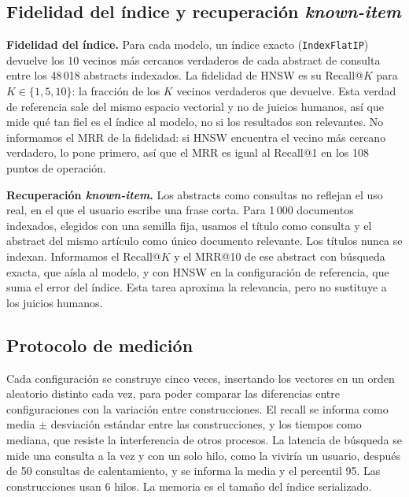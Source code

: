 \documentclass[runningheads]{llncs}
\begin{document}
\subsection{Fidelidad del índice y recuperación \textit{known-item}}

\textbf{Fidelidad del índice.} Para cada modelo, un índice exacto (\texttt{IndexFlatIP})
devuelve los 10 vecinos más cercanos verdaderos de cada abstract de consulta entre los 48\,018
abstracts indexados. La fidelidad de HNSW es su Recall@$K$ para $K \in \{1,5,10\}$: la
fracción de los $K$ vecinos verdaderos que devuelve. Esta verdad de referencia sale del mismo
espacio vectorial y no de juicios humanos, así que mide qué tan fiel es el índice al modelo,
no si los resultados son relevantes. No informamos el MRR de la fidelidad: si HNSW encuentra
el vecino más cercano verdadero, lo pone primero, así que el MRR es igual al Recall@1 en los
108 puntos de operación.

\textbf{Recuperación \textit{known-item}.} Los abstracts como consultas no reflejan el uso
real, en el que el usuario escribe una frase corta. Para 1\,000 documentos indexados, elegidos
con una semilla fija, usamos el título como consulta y el abstract del mismo artículo como
único documento relevante. Los títulos nunca se indexan. Informamos el Recall@$K$ y el MRR@10
\cite{ref16} de ese abstract con búsqueda exacta, que aísla al modelo, y con HNSW en la
configuración de referencia, que suma el error del índice. Esta tarea aproxima la relevancia,
pero no sustituye a los juicios humanos.

\subsection{Protocolo de medición}

Cada configuración se construye cinco veces, insertando los vectores en un orden aleatorio
distinto cada vez, para poder comparar las diferencias entre configuraciones con la variación
entre construcciones. El recall se informa como media $\pm$ desviación estándar entre las
construcciones, y los tiempos como mediana, que resiste la interferencia de otros procesos.
La latencia de búsqueda se mide una consulta a la vez y con un solo hilo, como la viviría un
usuario, después de 50 consultas de calentamiento, y se informa la media y el percentil 95.
Las construcciones usan 6 hilos. La memoria es el tamaño del índice serializado.
\end{document}
